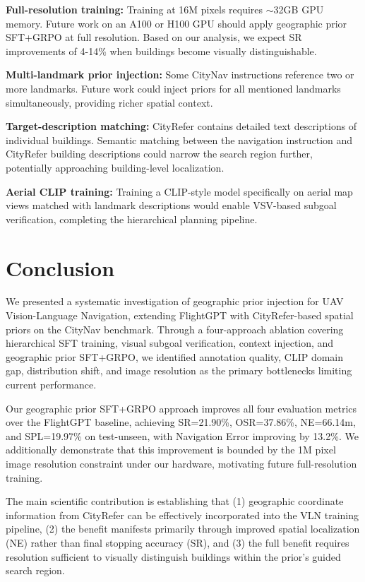 \documentclass[conference]{IEEEtran}
\begin{document}
\textbf{Full-resolution training:} Training at 16M pixels requires $\sim$32GB GPU memory. Future work on an A100 or H100 GPU should apply geographic prior SFT+GRPO at full resolution. Based on our analysis, we expect SR improvements of 4-14\% when buildings become visually distinguishable.

\textbf{Multi-landmark prior injection:} Some CityNav instructions reference two or more landmarks. Future work could inject priors for all mentioned landmarks simultaneously, providing richer spatial context.

\textbf{Target-description matching:} CityRefer contains detailed text descriptions of individual buildings. Semantic matching between the navigation instruction and CityRefer building descriptions could narrow the search region further, potentially approaching building-level localization.

\textbf{Aerial CLIP training:} Training a CLIP-style model specifically on aerial map views matched with landmark descriptions would enable VSV-based subgoal verification, completing the hierarchical planning pipeline.

\section{Conclusion}

We presented a systematic investigation of geographic prior injection for UAV Vision-Language Navigation, extending FlightGPT with CityRefer-based spatial priors on the CityNav benchmark. Through a four-approach ablation covering hierarchical SFT training, visual subgoal verification, context injection, and geographic prior SFT+GRPO, we identified annotation quality, CLIP domain gap, distribution shift, and image resolution as the primary bottlenecks limiting current performance.

Our geographic prior SFT+GRPO approach improves all four evaluation metrics over the FlightGPT baseline, achieving SR=21.90\%, OSR=37.86\%, NE=66.14m, and SPL=19.97\% on test-unseen, with Navigation Error improving by 13.2\%. We additionally demonstrate that this improvement is bounded by the 1M pixel image resolution constraint under our hardware, motivating future full-resolution training.

The main scientific contribution is establishing that (1) geographic coordinate information from CityRefer can be effectively incorporated into the VLN training pipeline, (2) the benefit manifests primarily through improved spatial localization (NE) rather than final stopping accuracy (SR), and (3) the full benefit requires resolution sufficient to visually distinguish buildings within the prior's guided search region.
\end{document}
